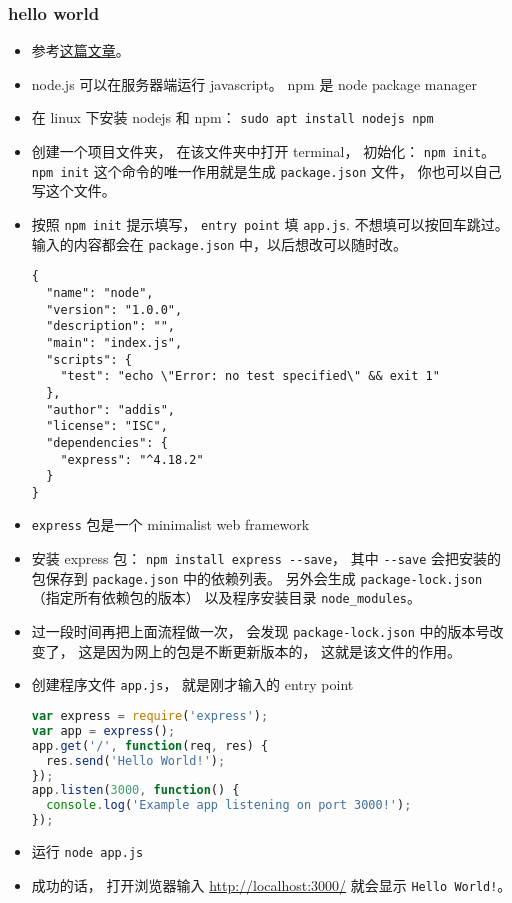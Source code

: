 
\begin{issues}
\issueDraft
\end{issues}


\subsubsection{hello world}
\begin{itemize}
\item 参考\href{https://medium.com/@adnanrahic/hello-world-app-with-node-js-and-express-c1eb7cfa8a30}{这篇文章}。
\item node.js 可以在服务器端运行 javascript。 npm 是 node package manager
\item 在 linux 下安装 nodejs 和 npm： \verb|sudo apt install nodejs npm|
\item 创建一个项目文件夹， 在该文件夹中打开 terminal， 初始化： \verb|npm init|。 \verb|npm init| 这个命令的唯一作用就是生成 \verb`package.json` 文件， 你也可以自己写这个文件。
\item 按照 \verb|npm init| 提示填写， \verb|entry point| 填 \verb`app.js`. 不想填可以按回车跳过。 输入的内容都会在 \verb|package.json| 中，以后想改可以随时改。
\begin{lstlisting}[language=none,caption=package.json 示例]
{
  "name": "node",
  "version": "1.0.0",
  "description": "",
  "main": "index.js",
  "scripts": {
    "test": "echo \"Error: no test specified\" && exit 1"
  },
  "author": "addis",
  "license": "ISC",
  "dependencies": {
    "express": "^4.18.2"
  }
}
\end{lstlisting}
\item \verb|express| 包是一个 minimalist web framework
\item 安装 express 包： \verb|npm install express --save|， 其中 \verb|--save| 会把安装的包保存到 \verb|package.json| 中的依赖列表。 另外会生成 \verb|package-lock.json| （指定所有依赖包的版本） 以及程序安装目录 \verb|node_modules|。
\item 过一段时间再把上面流程做一次， 会发现 \verb|package-lock.json| 中的版本号改变了， 这是因为网上的包是不断更新版本的， 这就是该文件的作用。
\item 创建程序文件 \verb|app.js|， 就是刚才输入的 entry point
\begin{lstlisting}[language=js]
var express = require('express');
var app = express();
app.get('/', function(req, res) {
  res.send('Hello World!');
});
app.listen(3000, function() {
  console.log('Example app listening on port 3000!');
});
\end{lstlisting}
\item 运行 \verb|node app.js|
\item 成功的话， 打开浏览器输入 \href{http://localhost:3000/}{http://localhost:3000/} 就会显示 \verb|Hello World!|。
\end{itemize}
